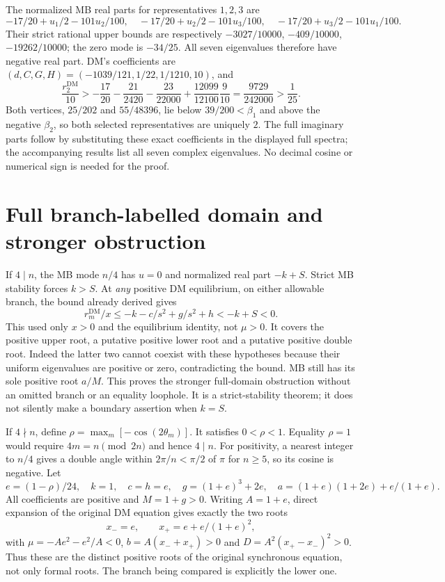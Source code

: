 \documentclass[11pt]{article}
\newcommand{\DM}{\mathrm{DM}}
\begin{document}
The normalized MB real parts for representatives $1,2,3$ are
\[
 -17/20+u_1/2-101u_2/100,\quad
 -17/20+u_2/2-101u_3/100,\quad
 -17/20+u_3/2-101u_1/100.
\]
Their strict rational upper bounds are respectively
$-3027/10000$, $-409/10000$, $-19262/10000$; the zero mode is
$-34/25$. All seven eigenvalues therefore have negative real part.
DM's coefficients are
$(d,C,G,H)=(-1039/121,1/22,1/1210,10)$, and
\[
 \frac{r_2^{\DM}}{10}
 >-\frac{17}{20}-\frac{21}{2420}-\frac{23}{22000}
       +\frac{12099}{12100}\frac9{10}
 =\frac{9729}{242000}>\frac1{25}.
\]
Both vertices, $25/202$ and $55/48396$, lie below
$39/200<\beta_1$ and above the negative $\beta_2$, so both selected
representatives are uniquely $2$. The full imaginary parts follow by
substituting these exact coefficients in the displayed full spectra;
the accompanying results list all seven complex eigenvalues. No decimal
cosine or numerical sign is needed for the proof.

\section{Full branch-labelled domain and stronger obstruction}
If $4\mid n$, the MB mode $n/4$ has $u=0$ and normalized real part
$-k+S$. Strict MB stability forces $k>S$. At \emph{any} positive DM
equilibrium, on either allowable branch, the bound already derived gives
\[
 r_m^{\DM}/x\le-k-c/s^2+g/s^2+h<-k+S<0.
\]
This used only $x>0$ and the equilibrium identity, not $\mu>0$.
It covers the positive upper root, a putative positive lower root and a
putative positive double root. Indeed the latter two cannot coexist
with these hypotheses because their uniform eigenvalues are positive
or zero, contradicting the bound. MB still has its sole positive root
$a/M$. This proves the stronger full-domain obstruction without an
omitted branch or an equality loophole. It is a strict-stability theorem;
it does not silently make a boundary assertion when $k=S$.

If $4\nmid n$, define $\rho=\max_m[-\cos(2\theta_m)]$.
It satisfies $0<\rho<1$. Equality $\rho=1$ would require
$4m=n\pmod{2n}$ and hence $4\mid n$. For positivity, a nearest
integer to $n/4$ gives a double angle within $2\pi/n<\pi/2$ of
$\pi$ for $n\ge5$, so its cosine is negative. Let
\[
 e=(1-\rho)/24,\quad k=1,\quad c=h=e,\quad
 g=(1+e)^3+2e,\quad
 a=(1+e)(1+2e)+e/(1+e).
\]
All coefficients are positive and $M=1+g>0$. Writing $A=1+e$,
direct expansion of the original DM equation gives exactly the two roots
\[
 x_-=e,\qquad x_+=e+e/(1+e)^2,
\]
with $\mu=-Ae^2-e^2/A<0$, $b=A(x_-+x_+)>0$ and
$D=A^2(x_+-x_-)^2>0$. Thus these are the distinct positive roots
of the original synchronous equation, not only formal roots.
The branch being compared is explicitly the lower one.
\end{document}
